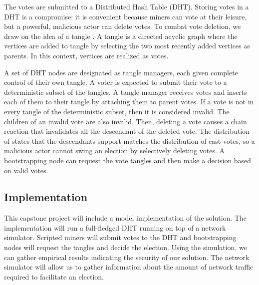 The votes are submitted to a Distributed Hash Table (DHT).
Storing votes in a DHT is a compromise: it is convenient because miners can vote at their leisure, but a powerful, malicious actor can delete votes.
To combat vote deletion, we draw on the idea of a tangle \cite{popov2016Tangle}.
A tangle is a directed acyclic graph where the vertices are added to tangle by selecting the two most recently added vertices as parents.
In this context, vertices are realized as votes.



A set of DHT nodes are designated as tangle managers, each given complete control of their own tangle.
A voter is expected to submit their vote to a deterministic subset of the tangles.
A tangle manager receives votes and inserts each of them to their tangle by attaching them to parent votes.
If a vote is not in every tangle of the deterministic subset, then it is considered invalid.
The children of an invalid vote are also invalid.
Then, deleting a vote causes a chain reaction that invalidates all the descendant of the deleted vote.
The distribution of states that the descendants support matches the distribution of cast votes, so a malicious actor cannot swing an election by selectively deleting votes.
A bootstrapping node can request the vote tangles and then make a decision based on valid votes.

\subsection{Implementation}

This capstone project will include a model implementation of the solution.
The implementation will run a full-fledged DHT running on top of a network simulator.
Scripted miners will submit votes to the DHT and bootstrapping nodes will request the tangles and decide the election.
Using the simulation, we can gather empirical results indicating the security of our solution.
The network simulator will allow us to gather information about the amount of network traffic required to facilitate an election.
